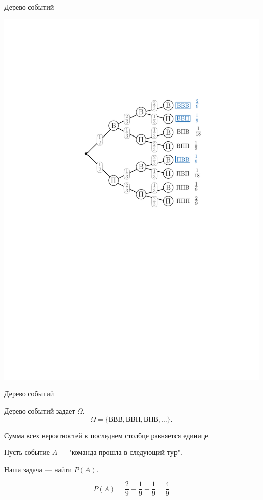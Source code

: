 \begin{frame}{Дерево событий}

\begin{center}
\includegraphics[width=\textheight]{img/tree000.pdf}
\end{center}

\end{frame}

\begin{frame}{Дерево событий}

Дерево событий задает $\Omega$.
$$\Omega=\{\text{ВВВ},\text{ВВП},\text{ВПВ}, \ldots\}.$$

Сумма всех вероятностей в последнем столбце равняется единице.

Пусть событие $A$ --- "команда прошла в следующий тур".

Наша задача --- найти $P(A)$.

$$P(A)=\frac{2}{9}+\frac{1}{9}+\frac{1}{9}=\boxed{\frac{4}{9}}$$

\end{frame}


